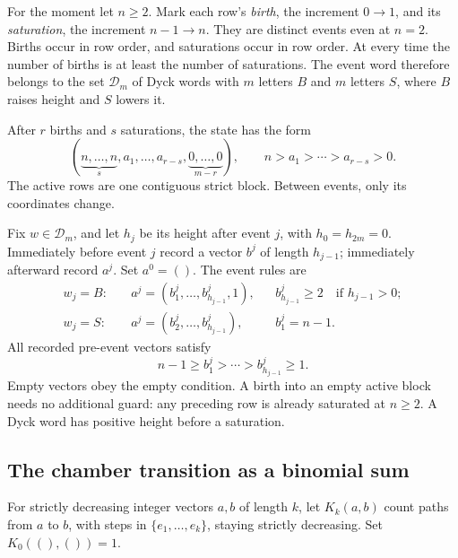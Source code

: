 \documentclass[11pt,letterpaper]{article}
\numberwithin{equation}{section}
\theoremstyle{definition}
\newcommand{\1}{\mathbf 1}
\begin{document}
For the moment let $n\ge2$. Mark each row's \emph{birth}, the increment $0\to1$, and its \emph{saturation}, the increment $n-1\to n$. They are distinct events even at $n=2$. Births occur in row order, and saturations occur in row order. At every time the number of births is at least the number of saturations. The event word therefore belongs to the set $\mathcal D_m$ of Dyck words with $m$ letters $B$ and $m$ letters $S$, where $B$ raises height and $S$ lowers it.

After $r$ births and $s$ saturations, the state has the form
\[
 (\underbrace{n,\ldots,n}_{s},a_1,\ldots,a_{r-s},
       \underbrace{0,\ldots,0}_{m-r}),
 \qquad n>a_1>\cdots>a_{r-s}>0.
\]
The active rows are one contiguous strict block. Between events, only its coordinates change.

Fix $w\in\mathcal D_m$, and let $h_j$ be its height after event $j$, with $h_0=h_{2m}=0$. Immediately before event $j$ record a vector $b^j$ of length $h_{j-1}$; immediately afterward record $a^j$. Set $a^0=()$. The event rules are
\begin{align}
 w_j=B:&\quad a^j=(b^j_1,\ldots,b^j_{h_{j-1}},1),
 &&b^j_{h_{j-1}}\ge2\quad\text{if }h_{j-1}>0;\label{shr:sd:eq:birth}\\
 w_j=S:&\quad a^j=(b^j_2,\ldots,b^j_{h_{j-1}}),
 &&b^j_1=n-1.\label{shr:sd:eq:saturate}
\end{align}
All recorded pre-event vectors satisfy
\begin{equation}\label{shr:sd:eq:guards}
 n-1\ge b^j_1>\cdots>b^j_{h_{j-1}}\ge1.
\end{equation}
Empty vectors obey the empty condition. A birth into an empty active block needs no additional guard: any preceding row is already saturated at $n\ge2$. A Dyck word has positive height before a saturation.

\subsection{The chamber transition as a binomial sum}
For strictly decreasing integer vectors $a,b$ of length $k$, let $K_k(a,b)$ count paths from $a$ to $b$, with steps in $\{e_1,\ldots,e_k\}$, staying strictly decreasing. Set $K_0((),())=1$.
\end{document}
